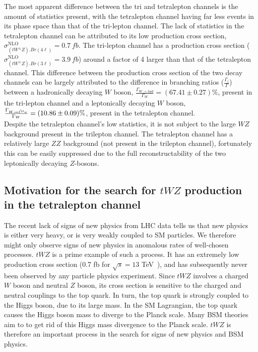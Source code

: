 The most apparent difference between the tri and tetralepton channels is the amount of statistics present, with the tetralepton channel having far less events in its phase space than that of the tri-lepton channel. The lack of statistics in the tetralepton channel can be attributed to its low production cross section, $\sigma^{\text{NLO}}_{(tW^{\pm}Z).Br(4\ell)} = \SI{0.7}{fb}$\cite{twz-theory-paper}. The tri-lepton channel has a production cross section ($\sigma^{\text{NLO}}_{(tW^{\pm}Z).Br(3\ell)} = \SI{3.9}{fb}$\cite{twz-theory-paper}) around a factor of 4 larger than that of the tetralepton channel. This difference between the production cross section of the two decay channels can be largely attributed to the difference in branching ratios ($\frac{\Gamma_i}{\Gamma}$) between a hadronically decaying $W$ boson, $\frac{\Gamma_{W \rightarrow had}}{\Gamma_W} = (67.41 \pm 0.27) \%$\cite{pdg}, present in the tri-lepton channel and a leptonically decaying $W$ boson, $\frac{\Gamma_{W \rightarrow \ell^{\+} \nu}}{\Gamma_W}  = (10.86 \pm 0.09) \%$\cite{pdg}, present in the tetralepton channel.\\

Despite the tetralepton channel's low statistics, it is not subject to the large $WZ$ background present in the trilepton channel. The tetralepton channel has a relatively large $ZZ$ background (not present in the trilepton channel), fortunately this can be easily suppressed due to the full reconstructability of the two leptonically decaying $Z$-bosons.

\subsection{Motivation for the search for $tWZ$ production in the tetralepton channel}
The recent lack of signs of new physics from LHC data tells us that new physics is either very heavy, or is very weakly coupled to SM particles. We therefore might only observe signs of new physics in anomalous rates of well-chosen processes. $tWZ$ is a prime example of such a process. It has an extremely low production cross section (0.7 fb for $\sqrt{s}= 13$ TeV~\cite{twz-theory-paper}), and has subsequently never been observed by any particle physics experiment. Since $tWZ$ involves a charged $W$ boson and neutral $Z$ boson, its cross section is sensitive to the charged and neutral couplings to the top quark. In turn, the top quark is strongly coupled to the Higgs boson, due to its large mass. In the SM Lagrangian, the top quark causes the Higgs boson mass to diverge to the Planck scale. Many BSM theories aim to to get rid of this Higgs mass divergence to the Planck scale. $tWZ$ is therefore an important process in the search for signs of new physics and BSM physics.\\

